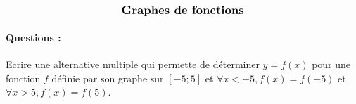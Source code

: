 \documentclass[11pt,a4paper]{article}
\begin{document}
\entete

\autoevaluation


$$\mbox{\textbf{\large Graphes de fonctions}}$$


\paragraph{Questions :}
Ecrire une alternative multiple qui permette
de déterminer $y = f(x)$ pour une fonction $f$ définie par son graphe
sur $[-5;5]$ et $\forall x < -5, f(x) = f(-5)$
et $\forall x > 5, f(x) = f(5)$.
\end{document}
